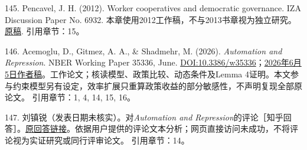 \documentclass[UTF8,fontset=windows,12pt,a4paper,oneside,openany]{ctexbook}
\begin{document}
145. Pencavel, J. H. (2012). Worker cooperatives and democratic governance. IZA Discussion Paper No. 6932. 本章使用2012工作稿，不与2013书章视为独立研究。\href{https://docs.iza.org/dp6932.pdf}{原稿}.
引用章节：15。

146. Acemoglu, D., Gitmez, A. A., \& Shadmehr, M. (2026). \emph{Automation and Repression}. NBER Working Paper 35336, June. \href{https://doi.org/10.3386/w35336}{DOI:10.3386/w35336}；\href{https://economics.mit.edu/sites/default/files/2026-06/Automation\%20and\%20Repression.pdf}{2026年6月5日作者稿}。工作论文；核读模型、政策比较、动态条件及Lemma 4证明。本文参与约束模型另有设定，效率扩展只重算政策收益的部分敏感性，不声明复现全部原论文。
引用章节：1, 4, 14, 15, 16。

147. 刘镇锐（发表日期未核实）。对\emph{Automation and Repression}的评论［知乎回答］。\href{https://www.zhihu.com/question/2083147887706366153/answer/2088453310651032052}{原回答链接}。依据用户提供的评论文本分析；网页直接访问未成功，不将评论视为实证研究或同行评审论文。
引用章节：14。
\end{document}

